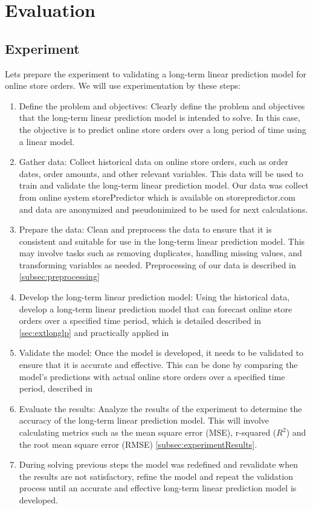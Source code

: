 
\chapter{Evaluation} \label{evaluation}
\section{Experiment} \label{sec:experiment}
Lets prepare the experiment to validating a long-term linear prediction model for online store orders. We will use experimentation by these steps:\\
\begin{enumerate}
    \item Define the problem and objectives: Clearly define the problem and objectives that the long-term linear prediction model is intended to solve.
    In this case, the objective is to predict online store orders over a long period of time using a linear model.
    \item Gather data: Collect historical data on online store orders, such as order dates, order amounts, and other relevant variables.
    This data will be used to train and validate the long-term linear prediction model. Our data was collect from online system storePredictor
    which is available on storepredictor.com and data are anonymized and pseudonimized to be used for next calculations.
    \item Prepare the data: Clean and preprocess the data to ensure that it is consistent and suitable for use in the long-term linear prediction model.
    This may involve tasks such as removing duplicates, handling missing values, and transforming variables as needed.
    Preprocessing of our data is described in \ref{subsec:preprocessing}
    \item Develop the long-term linear prediction model: Using the historical data, develop a long-term linear prediction model that can
    forecast online store orders over a specified time period, which is detailed described in \ref{sec:extlonglp} and practically applied in \label{subsec:calculate_models}
    \item Validate the model: Once the model is developed, it needs to be validated to ensure that it is accurate and effective.
    This can be done by comparing the model's predictions with actual online store orders over a specified time period, described in \label{subsec:validatibg_models}
    \item Evaluate the results: Analyze the results of the experiment to determine the accuracy of the long-term linear prediction model.
    This will involve calculating metrics such as the mean square error (MSE), r-squared ($R^2$) and the root mean square error (RMSE) \ref{subsec:experimentResults}.
    \item During solving previous steps the model was redefined and revalidate when the results are not satisfactory, refine the model and repeat the validation
    process until an accurate and effective long-term linear prediction model is developed.
\end{enumerate}
